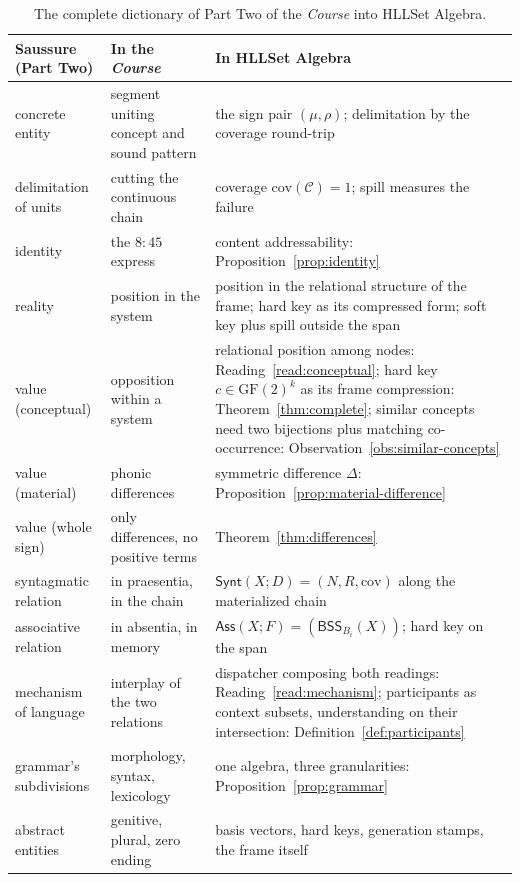 \documentclass[11pt,a4paper]{article}
\theoremstyle{remark}
\newcommand{\xor}{\ensuremath{\Delta}}                   %
\newcommand{\BSS}{\ensuremath{\mathsf{BSS}}}             %
\newcommand{\Ctx}{\ensuremath{\mathcal{C}}}              %
\newcommand{\Ing}{\ensuremath{\mu}}                      %
\newcommand{\Mat}{\ensuremath{\rho}}                     %
\newcommand{\Cov}{\ensuremath{\mathrm{cov}}}             %
\newcommand{\Synt}{\ensuremath{\mathsf{Synt}}}           %
\newcommand{\Ass}{\ensuremath{\mathsf{Ass}}}             %
\begin{document}
\begin{table}[htbp]
\centering
\renewcommand{\arraystretch}{1.15}
\begin{tabular}{@{}>{\raggedright\arraybackslash}p{3.6cm}
                    >{\raggedright\arraybackslash}p{4.4cm}
                    >{\raggedright\arraybackslash}p{6.8cm}@{}}
\toprule
Saussure (Part Two) & In the \textit{Course} & In HLLSet Algebra \\
\midrule
concrete entity & segment uniting concept and sound pattern & the sign pair
$(\Ing,\Mat)$; delimitation by the coverage round-trip \\
delimitation of units & cutting the continuous chain & coverage
$\Cov(\Ctx)=1$; spill measures the failure \\
identity & the $8{:}45$ express & content addressability:
Proposition~\ref{prop:identity} \\
reality & position in the system & position in the relational structure of the
frame; hard key as its compressed form; soft key plus spill outside the span \\
value (conceptual) & opposition within a system & relational position among
nodes: Reading~\ref{read:conceptual}; hard key $c\in\mathrm{GF}(2)^k$ as its
frame compression: Theorem~\ref{thm:complete}; similar concepts need two
bijections plus matching co-occurrence: Observation~\ref{obs:similar-concepts} \\
value (material) & phonic differences & symmetric difference $\xor$:
Proposition~\ref{prop:material-difference} \\
value (whole sign) & only differences, no positive terms &
Theorem~\ref{thm:differences} \\
syntagmatic relation & in praesentia, in the chain & $\Synt(X;D)=(N,R,\Cov)$
along the materialized chain \\
associative relation & in absentia, in memory & $\Ass(X;F)=(\BSS_{B_i}(X))$;
hard key on the span \\
mechanism of language & interplay of the two relations & dispatcher composing
both readings: Reading~\ref{read:mechanism}; participants as context subsets,
understanding on their intersection: Definition~\ref{def:participants} \\
grammar's subdivisions & morphology, syntax, lexicology & one algebra, three
granularities: Proposition~\ref{prop:grammar} \\
abstract entities & genitive, plural, zero ending & basis vectors, hard keys,
generation stamps, the frame itself \\
\bottomrule
\end{tabular}
\caption{The complete dictionary of Part Two of the \textit{Course} into
HLLSet Algebra.}
\label{tab:dictionary}
\end{table}
\end{document}
